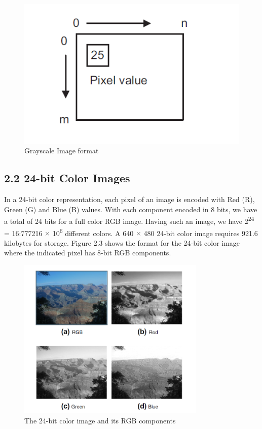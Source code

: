 \begin{figure}[H]
	\centering
	\includegraphics[scale = 0.5]{CHAPTERS/Chapter-2/Images/2.2.png}
	\caption{Grayscale Image format}
	\label{fig:2.2}
\end{figure}

\subsection{2.2	24-bit Color Images}
In a 24-bit color representation, each pixel of an image is 
encoded with Red (R), Green (G) and Blue (B) values. With each component 
encoded in 8 bits, we have a total of 24 bits for a full color RGB image. Having 
such an image, we have 2\textsuperscript{24} = 16:777216 $\times$ 10\textsuperscript{6} 
different colors. A 640 $\times$ 480 24-bit color 
image requires 921.6 kilobytes for storage. Figure 2.3 shows the format for the 24-bit 
color image where the indicated pixel has 8-bit RGB components.

\begin{figure}[H]
	\centering
	\includegraphics[width=0.80\textwidth]{CHAPTERS/Chapter-2/Images/2.3.png}
	\caption{The 24-bit color image and its RGB components}
	\label{fig:2.3}
\end{figure}

